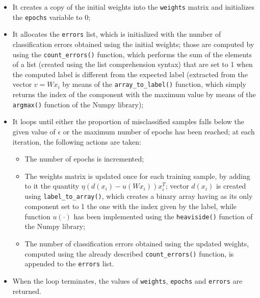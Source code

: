 \documentclass[letterpaper,headings=standardclasses]{scrartcl}
\begin{document}
\begin{itemize}

\item It creates a copy of the initial weights into the \texttt{weights} matrix and initializes the \texttt{epochs} variable to 0;

\item It allocates the \texttt{errors} list, which is initialized with the number of classification errors obtained using the initial weights; those are computed by using the \texttt{count\_errors()} function, which performs the sum of the elements of a list (created using the list comprehension syntax) that are set to 1 when the computed label is different from the expected label (extracted from the vector $v = Wx_i$ by means of the \texttt{array\_to\_label()} function, which simply returns the index of the component with the maximum value by means of the \texttt{argmax()} function of the Numpy library);

\item It loops until either the proportion of misclassified samples falls below the given value of $\epsilon$ or the maximum number of epochs has been reached; at each iteration, the following actions are taken: 

\begin{itemize}

\item The number of epochs is incremented;

\item The weights matrix is updated once for each training sample, by adding to it the quantity $\eta (d(x_i) - u(Wx_i)) x_i^T$; vector $d(x_i)$ is created using \texttt{label\_to\_array()}, which creates a binary array having as its only component set to 1 the one with the index given by the label, while function $u(\cdot)$ has been implemented using the \texttt{heaviside()} function of the Numpy library;

\item The number of classification errors obtained using the updated weights, computed using the already described \texttt{count\_errors()} function, is appended to the \texttt{errors} list.

\end{itemize}

\item When the loop terminates, the values of \texttt{weights}, \texttt{epochs} and \texttt{errors} are returned.

\end{itemize}
\end{document}
